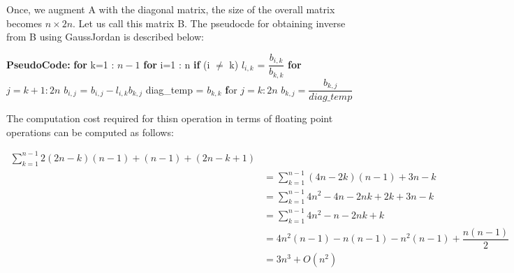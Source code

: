 \documentclass{article}
\newcommand\pseudoCode{\vspace{.10in}\textbf{PseudoCode: }}
\begin{document}
Once, we augment A with  the diagonal matrix, the size of the overall matrix becomes $n \times 2n$. Let us call this matrix B. The pseudocde for obtaining inverse from B using GaussJordan is described below: \newline

\pseudoCode \newline
\hspace*{0.5cm} \textbf {for} k=1 : $n-1$ \newline
\hspace*{1cm}      \textbf {for} i=1 : n \newline
\hspace*{1.5cm}     \textbf {if} (i $\neq$ k) \newline
\hspace*{2cm}            $l_{i,k}$ = $\dfrac{b_{i,k}}{b_{k,k}}$ \newline
\hspace*{2cm}               \textbf {for} $j=k+1 : 2n$ \newline
\hspace*{2.5cm}               $ b_{i,j}$ =  $b_{i,j} - l_{i,k}b_{k,j}$ \newline
\hspace*{1cm}    diag\_temp = $b_{k,k}$ \newline
\hspace*{1cm}    \textbf for $j=k:2n$ \newline
\hspace*{1.5cm}                 $b_{k,j} = \dfrac{b_{k,j}}{diag\_temp}$ \newline

The computation cost required for thisn operation in terms of floating point operations can be computed as follows: \newline
  
\begin{align*}
  \sum_{k=1}^{n-1} 2(2n-k)(n-1) + (n-1) + (2n - k + 1) \\
 &= \sum_{k=1}^{n-1} (4n - 2k)(n-1) + 3n - k \\
 &= \sum_{k=1}^{n-1} 4n^2 -4n -2nk + 2k + 3n - k \\
 &= \sum_{k=1}^{n-1} 4n^2 -n -2nk + k \\
&= 4n^2(n-1) -n(n-1) -n^2(n-1) +\dfrac{n(n-1)}{2} \\
&= 3n^3 + O(n^2) \\
\end{align*}
\end{document}
